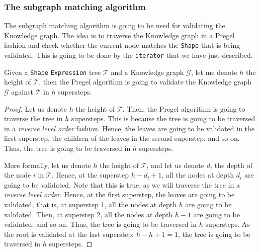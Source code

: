 \subsubsection{The subgraph matching algorithm}

The subgraph matching algorithm is going to be used for validating the Knowledge graph. The idea is to traverse the Knowledge graph in a Pregel fashion and check whether the current node matches the \texttt{Shape} that is being validated. This is going to be done by the \texttt{iterator} that we have just described.

\begin{theorem}
    Given a \texttt{Shape} \texttt{Expression} tree $\mathcal{T}$ and a Knowledge graph $\mathcal{G}$, let me denote $h$ the height of $\mathcal{T}$, then the Pregel algorithm is going to validate the Knowledge graph $\mathcal{G}$ against $\mathcal{T}$ in $h$ supersteps.
\end{theorem}

\begin{proof}
    Let us denote $h$ the height of $\mathcal{T}$. Then, the Pregel algorithm is going to traverse the tree in $h$ supersteps. This is because the tree is going to be traversed in a \textit{reverse level order} fashion. Hence, the leaves are going to be validated in the first superstep, the children of the leaves in the second superstep, and so on. Thus, the tree is going to be traversed in $h$ supersteps.

    More formally, let us denote $h$ the height of $\mathcal{T}$, and let us denote $d_i$ the depth of the node $i$ in $\mathcal{T}$. Hence, at the superstep $h - d_i + 1$, all the nodes at depth $d_i$ are going to be validated. Note that this is true, as we will traverse the tree in a \textit{reverse level order}. Hence, at the first superstep, the leaves are going to be validated, that is, at superstep 1, all the nodes at depth $h$ are going to be validated. Then, at superstep 2, all the nodes at depth $h - 1$ are going to be validated, and so on. Thus, the tree is going to be traversed in $h$ supersteps. As the root is validated at the last superstep: $h - h + 1 = 1$, the tree is going to be traversed in $h$ supersteps.
\end{proof}

\begin{pseudocode}
    
\end{pseudocode}


